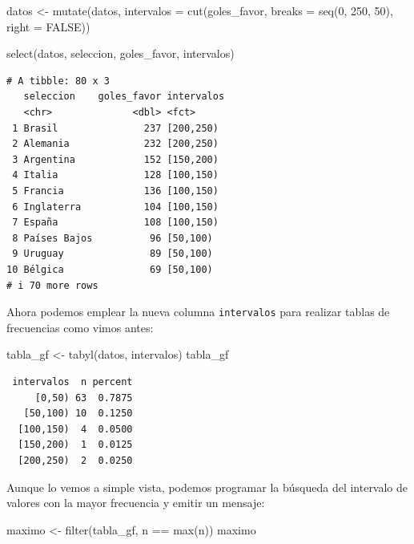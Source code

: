 \documentclass[
]{book}
\newenvironment{Shaded}{\begin{snugshade}}{\end{snugshade}}
\newcommand{\AttributeTok}[1]{\textcolor[rgb]{0.77,0.63,0.00}{#1}}
\newcommand{\ConstantTok}[1]{\textcolor[rgb]{0.00,0.00,0.00}{#1}}
\newcommand{\DecValTok}[1]{\textcolor[rgb]{0.00,0.00,0.81}{#1}}
\newcommand{\FunctionTok}[1]{\textcolor[rgb]{0.00,0.00,0.00}{#1}}
\newcommand{\NormalTok}[1]{#1}
\newcommand{\OtherTok}[1]{\textcolor[rgb]{0.56,0.35,0.01}{#1}}
\newcommand{\SpecialCharTok}[1]{\textcolor[rgb]{0.00,0.00,0.00}{#1}}
\begin{document}
\begin{Shaded}
\begin{Highlighting}[]
\NormalTok{datos }\OtherTok{\textless{}{-}} \FunctionTok{mutate}\NormalTok{(datos, }\AttributeTok{intervalos =} \FunctionTok{cut}\NormalTok{(goles\_favor, }\AttributeTok{breaks =} \FunctionTok{seq}\NormalTok{(}\DecValTok{0}\NormalTok{, }\DecValTok{250}\NormalTok{, }\DecValTok{50}\NormalTok{), }\AttributeTok{right =} \ConstantTok{FALSE}\NormalTok{))}

\FunctionTok{select}\NormalTok{(datos, seleccion, goles\_favor, intervalos)}
\end{Highlighting}
\end{Shaded}

\begin{verbatim}
# A tibble: 80 x 3
   seleccion    goles_favor intervalos
   <chr>              <dbl> <fct>     
 1 Brasil               237 [200,250) 
 2 Alemania             232 [200,250) 
 3 Argentina            152 [150,200) 
 4 Italia               128 [100,150) 
 5 Francia              136 [100,150) 
 6 Inglaterra           104 [100,150) 
 7 España               108 [100,150) 
 8 Países Bajos          96 [50,100)  
 9 Uruguay               89 [50,100)  
10 Bélgica               69 [50,100)  
# i 70 more rows
\end{verbatim}

Ahora podemos emplear la nueva columna \texttt{intervalos} para realizar tablas de frecuencias como vimos antes:

\begin{Shaded}
\begin{Highlighting}[]
\NormalTok{tabla\_gf }\OtherTok{\textless{}{-}} \FunctionTok{tabyl}\NormalTok{(datos, intervalos)}
\NormalTok{tabla\_gf}
\end{Highlighting}
\end{Shaded}

\begin{verbatim}
 intervalos  n percent
     [0,50) 63  0.7875
   [50,100) 10  0.1250
  [100,150)  4  0.0500
  [150,200)  1  0.0125
  [200,250)  2  0.0250
\end{verbatim}

Aunque lo vemos a simple vista, podemos programar la búsqueda del intervalo de valores con la mayor frecuencia y emitir un mensaje:

\begin{Shaded}
\begin{Highlighting}[]
\NormalTok{maximo }\OtherTok{\textless{}{-}} \FunctionTok{filter}\NormalTok{(tabla\_gf, n }\SpecialCharTok{==} \FunctionTok{max}\NormalTok{(n))}
\NormalTok{maximo}
\end{Highlighting}
\end{Shaded}
\end{document}
